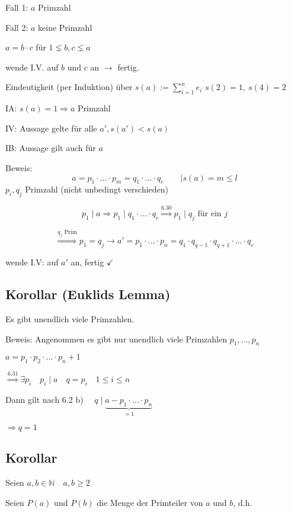 \documentclass[a4paper, 12pt, twoside] {article}
\begin{document}
\qquad	Fall 1: $a$ Primzahl \checkmark
	
\qquad	Fall 2: $a$ keine Primzahl
	
\qquad	$a=b \cdot c$ für $1 \lneq b, c \lneq a$
	
\qquad	wende I.V. auf $b$ und $c$ an $\rightarrow$ fertig.
	
Eindeutigkeit (per Induktion) über $s(a) := \sum_{i=1}^{n} e_i$ \hfill $s(2) = 1, \ s(4) = 2$

IA:		$s(a) = 1 \Rightarrow a$ Primzahl \checkmark

IV:		Aussage gelte für alle $a', s(a') < s(a)$

IB:		Aussage gilt auch für $a$

Beweis:
$$a = p_1 \cdot ... \cdot p_m = q_1 \cdot ... \cdot q_e \qquad | s(a) = m \leq l$$
\hfill $p_i, q_j$ Primzahl (nicht unbedingt verschieden)

$$p_1 \mid a \Rightarrow p_1 \mid q_1 \cdot ... \cdot q_e \overset{6.30}{\Rightarrow} p_1 \mid q_j \text{ für ein } j$$

$$\overset{q_j \text{ Prim}}{\Rightarrow} p_1 = q_j \rightarrow a' = p_1 \cdot ... \cdot p_n = q_1 \cdot q_{q-1} \cdot q_{q+1} \cdot ... \cdot q_e$$

\qquad \qquad wende I.V: auf $a'$ an, fertig \hfill $\checkmark$

\subsection{Korollar (Euklids Lemma)} %

Es gibt unendlich viele Primzahlen.

Beweis:	Angenommen es gibt nur unendlich viele Primzahlen $p_1, ..., p_n$

$a = p_1 \cdot p_2 \cdot ... \cdot p_n + 1$

$\overset{6.31}{\Rightarrow} \exists p_i \quad p_i \mid a \quad q = p_i \quad 1 \leq i \leq n$
	
Dann gilt nach 6.2 b) $\quad q \mid \underbrace{a - p_1 \cdot ... \cdot p_n}_{=1}$

$\Rightarrow q = 1$ \Lightning

\subsection{Korollar} %

Seien $a,b \in \mathbb{N} \quad a,b \geq 2$

Seien $P(a)$ und $P(b)$ die Menge der Primteiler von $a$ und $b$, d.h.
\end{document}
